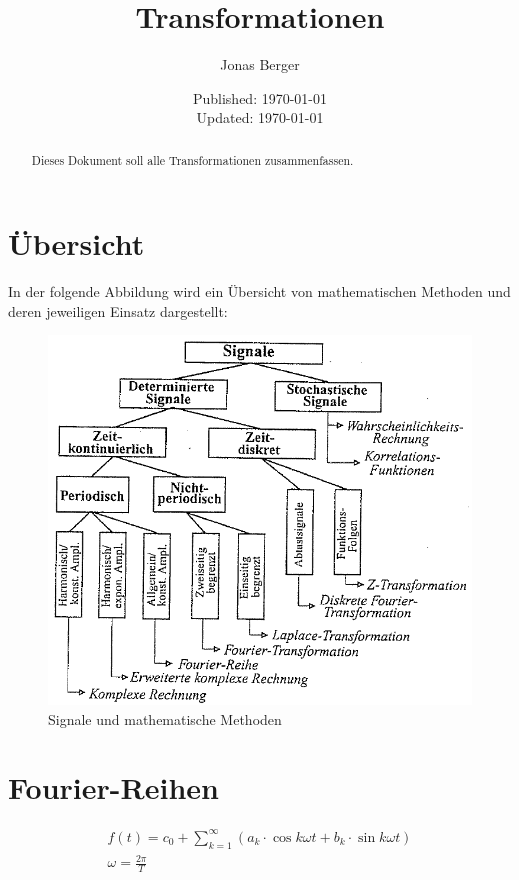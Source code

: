 \documentclass[12pt,a4paper]{article}
\title{Transformationen}
\author{Jonas Berger}
\date{Published: \today \\ Updated: \today}
\begin{document}
\maketitle
\pagebreak

\renewcommand{\abstractname}{Abstract} %
\begin{abstract} %
	Dieses Dokument soll alle Transformationen zusammenfassen.
\end{abstract}
\pagebreak

\tableofcontents
\pagebreak

\section{\"Ubersicht}
In der folgende Abbildung wird ein Übersicht von mathematischen Methoden und deren jeweiligen Einsatz dargestellt:
\begin{figure}[h]
	\centering
	\includegraphics[width=0.8\linewidth]{signale_math_methoden}
	\caption{Signale und mathematische Methoden}
	\label{figure:1}
\end{figure}
\pagebreak

\section{Fourier-Reihen}
\begin{gather*}
	f(t) = c_0 + \sum_{k=1}^{\infty}(a_k\cdot\cos{k\omega t}+b_k\cdot\sin{k\omega t}) \\
	\omega = \frac{2\pi}{T}
\end{gather*}

\end{document}
